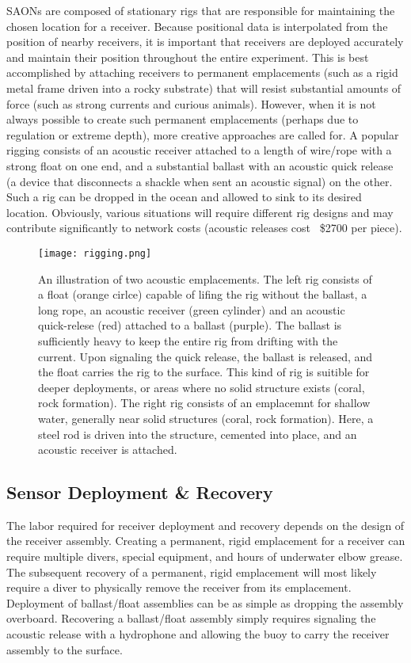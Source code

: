 SAONs are composed of stationary rigs that are responsible for maintaining the chosen location for a receiver.  Because positional data is interpolated from the position of nearby receivers, it is important that receivers are deployed accurately and maintain their position throughout the entire experiment\cite{Heupel2006}.  This is best accomplished by attaching receivers to permanent emplacements  (such as a rigid metal frame driven into a rocky substrate) that will resist substantial amounts of force (such as strong currents and curious animals).  However, when it is not always possible to create such permanent emplacements (perhaps due to regulation or extreme depth), more creative approaches are called for.  A popular rigging consists of an acoustic receiver attached to a length of wire/rope with a strong float on one end, and a substantial ballast with an acoustic quick release (a device that disconnects a shackle when sent an acoustic signal) on the other\cite{Heupel2006}.  Such a rig can be dropped in the ocean and allowed to sink to its desired location.  Obviously, various situations will require different rig designs and may contribute significantly to network costs (acoustic releases cost ~\$2700 per piece).


\begin{figure}[h]
	\label{rigging}
	\centering
	\texttt{[image: rigging.png]}
	\caption{An illustration of two acoustic emplacements.  The left rig consists of a float (orange cirlce) capable of lifing the rig without the ballast, a long rope, an acoustic receiver (green cylinder) and an acoustic quick-relese (red) attached to a ballast (purple).  The ballast is sufficiently heavy to keep the entire rig from drifting with the current.  Upon signaling the quick release, the ballast is released, and the float carries the rig to the surface.   This kind of rig is suitible for deeper deployments, or areas where no solid structure exists (coral, rock formation).   The right rig consists of an emplacemnt for shallow water, generally near solid structures (coral, rock formation).  Here, a steel rod is driven into the structure, cemented into place, and an acoustic receiver is attached. }
\end{figure}

\subsection{Sensor Deployment \& Recovery}
The labor required for receiver deployment and recovery depends on the design of the receiver assembly.  Creating a permanent, rigid emplacement for a receiver can require multiple divers, special equipment,  and hours of underwater elbow grease.  The subsequent recovery of a permanent, rigid emplacement will most likely require a diver to physically remove the receiver from its emplacement. Deployment of ballast/float assemblies can be as simple as dropping the assembly overboard.  Recovering a ballast/float assembly simply requires signaling the acoustic release with a hydrophone and allowing the buoy to carry the receiver assembly to the surface.

